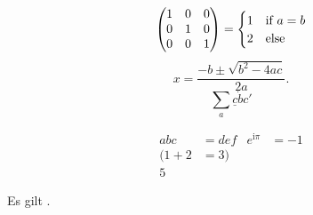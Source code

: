 \documentclass{article}
\begin{document}
\[
  \begin{pmatrix}
    1 & 0 & 0 \\
    0 & 1 & 0 \\
    0 & 0 & 1
  \end{pmatrix}
  =
  \begin{cases}
    1 & $if $a=b\\
    2 & $else$
  \end{cases}
\]
\[
  x = \frac{-b \pm \sqrt{b^2-4ac}}{2a}.
\]
\[
  \sum_a\underline c\dot bc'
\]

\LuaMMLTagAF{} {
\begin{align}
  abc&=def & e^{\mathrm{i}\pi}&=-1\\
  \Big(1+2&=3\Big)\\
  5
\end{align}
}

Es gilt .
\tagstructend
\end{document}
